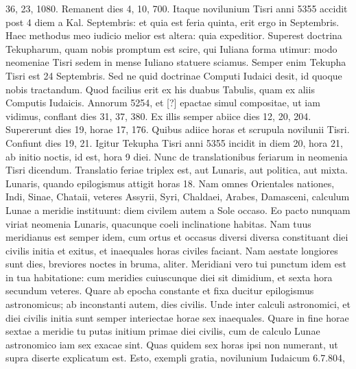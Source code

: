 36, 23, 1080.
Remanent dies 4, 10, 700.
Itaque novilunium Tisri
anni 5355 accidit post 4 diem a Kal. Septembris: et quia est feria
quinta, erit ergo in  Septembris.
Haec methodus meo iudicio melior
est altera: quia expeditior.
Superest doctrina Tekupharum,
quam nobis promptum est scire, qui Iuliana forma utimur: modo
neomeniae Tisri sedem in mense Iuliano statuere sciamus.
Semper
enim Tekupha Tisri est 24 Septembris.
Sed ne quid doctrinae Computi
Iudaici desit, id quoque nobis tractandum.
Quod facilius erit
ex his duabus Tabulis, quam ex aliis Computis Iudaicis.
Annorum
5254, et [?] epactae simul compositae, ut iam vidimus, conflant
dies 31, 37, 380.
Ex illis semper abiice dies 12, 20, 204.
Supererunt
dies 19, horae 17, 176.
Quibus adiice horas et scrupula novilunii Tisri.
Confiunt dies 19, 21.
Igitur Tekupha Tisri anni 5355 incidit in diem
20, hora 21, ab initio noctis, id est, hora 9 diei.
Nunc de translationibus
feriarum in neomenia Tisri dicendum.
Translatio feriae triplex est,
aut Lunaris, aut politica, aut mixta.
Lunaris, quando epilogismus
attigit horas 18.
%
Nam omnes Orientales nationes,
Indi, Sinae, Chataii, veteres Assyrii, Syri, Chaldaei,
Arabes, Damasceni, calculum Lunae a meridie
instituunt: diem civilem autem a Sole occaso.
Eo pacto nunquam viriat neomenia Lunaris, quacunque
coeli inclinatione habitas.
Nam tuus meridianus
est semper idem, cum ortus et occasus diversi
diversa constituant diei civilis initia et exitus, et
inaequales horas civiles faciant.
Nam aestate longiores
sunt dies, breviores noctes in bruma, aliter.
Meridiani
vero tui punctum idem est in tua habitatione:
cum meridies cuiuscunque diei sit dimidium, et sexta
hora secundum veteres.
%
Quare ab epocha constante et fixa ducitur
epilogismus astronomicus; ab inconstanti autem, dies civilis.
Unde
inter calculi astronomici, et diei civilis initia sunt semper interiectae
horae sex inaequales.
Quare in fine horae sextae a meridie tu putas initium
primae diei civilis, cum de calculo Lunae astronomico iam sex
exacae sint.
Quas quidem sex horas ipsi non numerant, ut supra diserte
explicatum est.
Esto, exempli gratia, novilunium Iudaicum 6.7.804,
